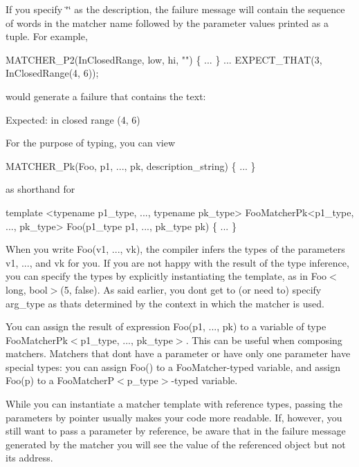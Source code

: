 If you specify {\ttfamily \char`\"{}\char`\"{}} as the description, the failure message will contain the sequence of words in the matcher name followed by the parameter values printed as a tuple. For example, 
\begin{DoxyCode}
MATCHER\_P2(InClosedRange, low, hi, "") \{ ... \}
...
EXPECT\_THAT(3, InClosedRange(4, 6));
\end{DoxyCode}
 would generate a failure that contains the text\+: 
\begin{DoxyCode}
Expected: in closed range (4, 6)
\end{DoxyCode}


For the purpose of typing, you can view 
\begin{DoxyCode}
MATCHER\_Pk(Foo, p1, ..., pk, description\_string) \{ ... \}
\end{DoxyCode}
 as shorthand for 
\begin{DoxyCode}
template <typename p1\_type, ..., typename pk\_type>
FooMatcherPk<p1\_type, ..., pk\_type>
Foo(p1\_type p1, ..., pk\_type pk) \{ ... \}
\end{DoxyCode}


When you write {\ttfamily Foo(v1, ..., vk)}, the compiler infers the types of the parameters {\ttfamily v1}, ..., and {\ttfamily vk} for you. If you are not happy with the result of the type inference, you can specify the types by explicitly instantiating the template, as in {\ttfamily Foo$<$long, bool$>$(5, false)}. As said earlier, you don\textquotesingle{}t get to (or need to) specify {\ttfamily arg\+\_\+type} as that\textquotesingle{}s determined by the context in which the matcher is used.

You can assign the result of expression {\ttfamily Foo(p1, ..., pk)} to a variable of type {\ttfamily Foo\+Matcher\+Pk$<$p1\+\_\+type, ..., pk\+\_\+type$>$}. This can be useful when composing matchers. Matchers that don\textquotesingle{}t have a parameter or have only one parameter have special types\+: you can assign {\ttfamily Foo()} to a {\ttfamily Foo\+Matcher}-\/typed variable, and assign {\ttfamily Foo(p)} to a {\ttfamily Foo\+MatcherP$<$p\+\_\+type$>$}-\/typed variable.

While you can instantiate a matcher template with reference types, passing the parameters by pointer usually makes your code more readable. If, however, you still want to pass a parameter by reference, be aware that in the failure message generated by the matcher you will see the value of the referenced object but not its address.

